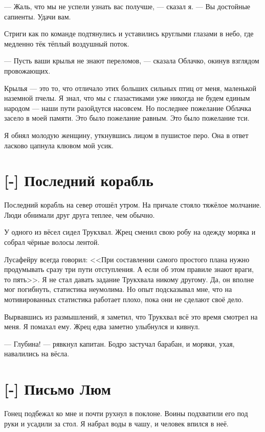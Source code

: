 --- Жаль, что мы не успели узнать вас получше, --- сказал я.
--- Вы достойные сапиенты.
Удачи вам.

Стриги как по команде подтянулись и уставились круглыми глазами в небо, где медленно тёк тёплый воздушный поток.

--- Пусть ваши крылья не знают переломов, --- сказала Облачко, окинув взглядом провожающих.

Крылья --- это то, что отличало этих больших сильных птиц от меня, маленькой наземной пчелы.
Я знал, что мы с глазастиками уже никогда не будем единым народом --- наши пути разойдутся насовсем.
Но последнее пожелание Облачка засело в моей памяти.
Это было пожелание равным.
Это было пожелание тси.

Я обнял молодую женщину, уткнувшись лицом в пушистое перо.
Она в ответ ласково цапнула клювом мой усик.

\section{[-] Последний корабль}

Последний корабль на север отошёл утром.
На причале стояло тяжёлое молчание.
Люди обнимали друг друга теплее, чем обычно.

У одного из вёсел сидел Трукхвал.
Жрец сменил свою робу на одежду моряка и собрал чёрные волосы лентой.

Лусафейру всегда говорил: <<При составлении самого простого плана нужно продумывать сразу три пути отступления.
А если об этом правиле знают враги, то пять>>.
Я не стал давать задание Трукхвала никому другому.
Да, он вполне мог погибнуть, статистика неумолима.
Но опыт подсказывал мне, что на мотивированных статистика работает плохо, пока они не сделают своё дело.

Вырвавшись из размышлений, я заметил, что Трукхвал всё это время смотрел на меня.
Я помахал ему.
Жрец едва заметно улыбнулся и кивнул.

--- Глубина! --- рявкнул капитан.
Бодро застучал барабан, и моряки, ухая, навалились на вёсла.

\section{[-] Письмо Люм}

\textspace

Гонец подбежал ко мне и почти рухнул в поклоне.
Воины подхватили его под руки и усадили за стол.
Я набрал воды в чашу, и человек впился в неё.


